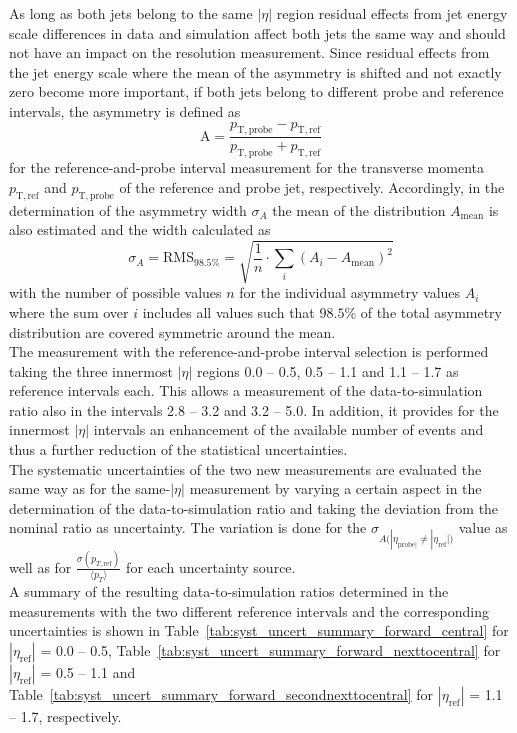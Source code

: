 As long as both jets belong to the same $|\eta|$ region residual effects from jet energy scale differences in data and simulation affect both jets the same way and should not have an impact on the resolution measurement. Since residual effects from the jet energy scale where the mean of the asymmetry is shifted and not exactly zero become more important, if both jets belong to different probe and reference intervals, the asymmetry is defined as
\begin{equation}
\label{eq:forwardasymmdef}
  \mathrm{A} = \frac{p_{\mathrm{T,probe}} - p_{\mathrm{T,ref}}}{p_{\mathrm{T,probe}} + p_{\mathrm{T,ref}}} 
 \end{equation}
for the reference-and-probe interval measurement for the transverse momenta $p_{\mathrm{T,ref}}$ and $p_{\mathrm{T,probe}}$ of the reference and probe jet, respectively. Accordingly, in the determination of the asymmetry width $\sigma_{A}$ the mean of the distribution $A_\mathrm{mean}$ is also estimated and the width calculated as
\begin{equation}
\label{eq:forwardasymmwidthdef}
  \sigma_{A} = \mathrm{RMS}_{98.5\%} = \sqrt{\frac{1}{n} \cdot \sum_{i}(A_i-A_\mathrm{mean})^2} 
 \end{equation}
with the number of possible values $n$ for the individual asymmetry values $A_i$ where the sum over $i$ includes all values such that $98.5\%$ of the total asymmetry distribution are covered symmetric around the mean.\\
The measurement with the reference-and-probe interval selection is performed taking the three innermost $|\eta|$ regions 0.0 -- 0.5, 0.5 -- 1.1 and 1.1 -- 1.7 as reference intervals each. This allows a measurement of the data-to-simulation ratio also in the intervals 2.8 -- 3.2 and 3.2 -- 5.0. In addition, it provides for the innermost $|\eta|$ intervals an enhancement of the available number of events and thus a further reduction of the statistical uncertainties.\\
The systematic uncertainties of the two new measurements are evaluated the same way as for the same-$|\eta|$ measurement by varying a certain aspect in the determination of the data-to-simulation ratio and taking the deviation from the nominal ratio as uncertainty. The variation is done for the $\sigma_{A({|\eta_{\mathrm{probe}|} \neq |\eta_{\mathrm{ref}}|)}}$ value as well as for $\frac{\sigma (p_{T, \mathrm{ref}})}{{\langle p_{T} \rangle}}$ for each uncertainty source.\\
A summary of the resulting data-to-simulation ratios determined in the measurements with the two different reference intervals and the corresponding uncertainties is shown in Table~\ref{tab:syst_uncert_summary_forward_central} for $|\eta_\mathrm{ref}|$ = 0.0 -- 0.5, Table~\ref{tab:syst_uncert_summary_forward_nexttocentral} for $|\eta_\mathrm{ref}|$ = 0.5 -- 1.1 and Table~\ref{tab:syst_uncert_summary_forward_secondnexttocentral} for $|\eta_\mathrm{ref}|$ = 1.1 -- 1.7, respectively.

